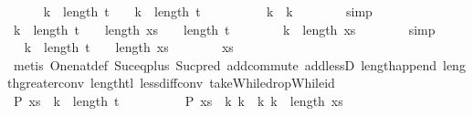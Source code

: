 \begin{isabellebody}
\ \ \ \ \isamarkupfalse%
\ {\isachardoublequoteopen}k{}\ {\isacharplus}\ length\ {\isacharquery}t\ {\isacharplus}\ {}\ {\isacharless}\ k{}\ {\isacharplus}\ length\ {\isacharquery}t\ {\isacharplus}\ {}{\isachardoublequoteclose}\isanewline
\ \ \ \ \ \ \isamarkupfalse%
\ {\isacharbackquoteopen}k{}\ {\isacharless}\ k{}{\isacharbackquoteclose}\isanewline
\ \ \ \ \ \ \isamarkupfalse%
\ simp\isanewline
\ \ \isamarkupfalse%
\isanewline
\ \ \ \ \isamarkupfalse%
\ {\isachardoublequoteopen}k{}\ {\isacharplus}\ length\ {\isacharquery}t\ {\isacharplus}\ {}\ {\isacharless}\ length\ {\isacharquery}xs\ {\isacharplus}\ {}\ {\isacharplus}\ length\ {\isacharquery}t{\isachardoublequoteclose}\isanewline
\ \ \ \ \ \ \isamarkupfalse%
\ {\isacharbackquoteopen}k{}\ {\isacharless}\ length\ {\isacharquery}xs{\isacharbackquoteclose}\isanewline
\ \ \ \ \ \ \isamarkupfalse%
\ simp\isanewline
\ \ \ \ \isamarkupfalse%
\ \isamarkupfalse%
\ {\isachardoublequoteopen}k{}\ {\isacharplus}\ length\ {\isacharquery}t\ {\isacharplus}\ {}\ {\isacharless}\ length\ xs{\isachardoublequoteclose}\isanewline
\ \ \ \ \ \ \isamarkupfalse%
\ {\isacharbackquoteopen}{\isacharquery}xs\ {\isasymnoteq}\ {\isacharbrackleft}{\isacharbrackright}{\isacharbackquoteclose}\isanewline
\ \ \ \ \ \ \isamarkupfalse%
\ {\isacharparenleft}metis\ One{\isacharunderscore}nat{\isacharunderscore}def\ Suc{\isacharunderscore}eq{\isacharunderscore}plus{}\ Suc{\isacharunderscore}pred\ add{\isachardot}commute\ add{\isacharunderscore}lessD{}\ length{\isacharunderscore}append\ length{\isacharunderscore}greater{\isacharunderscore}{}{\isacharunderscore}conv\ length{\isacharunderscore}tl\ less{\isacharunderscore}diff{\isacharunderscore}conv\ takeWhile{\isacharunderscore}dropWhile{\isacharunderscore}id{\isacharparenright}\isanewline
\ \ \isamarkupfalse%
\isanewline
\ \ \ \ \isamarkupfalse%
\ {\isachardoublequoteopen}P\ {\isacharparenleft}xs\ {\isacharbang}\ {\isacharparenleft}k{}\ {\isacharplus}\ length\ {\isacharquery}t\ {\isacharplus}\ {}{\isacharparenright}{\isacharparenright}{\isachardoublequoteclose}\isanewline
\ \ \ \ \ \ \isamarkupfalse%
\ {\isacharbackquoteopen}P\ {\isacharparenleft}{\isacharquery}xs\ {\isacharbang}\ k{}{\isacharparenright}{\isacharbackquoteclose}\ {\isacharbackquoteopen}k{}\ {\isacharless}\ k{}{\isacharbackquoteclose}\ {\isacharbackquoteopen}k{}\ {\isacharless}\ length\ {\isacharquery}xs{\isacharbackquoteclose}\ {\isacharasterisk}\isanewline

\end{isabellebody}
